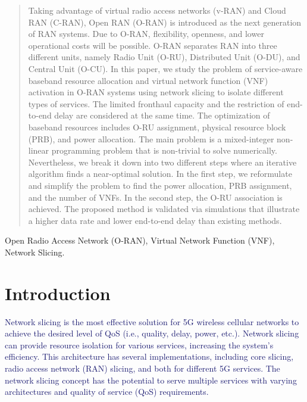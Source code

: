 \documentclass[lettersize,journal]{IEEEtran}
\begin{document}
\begin{abstract}
Taking advantage of virtual radio access networks (v-RAN) and Cloud RAN (C-RAN), Open RAN (O-RAN) is introduced as the next generation of RAN systems. Due to O-RAN, flexibility, openness, and lower operational costs will be possible. O-RAN separates RAN into three different units, namely Radio Unit (O-RU), Distributed Unit (O-DU), and Central Unit (O-CU).
In this paper, we study the problem of service-aware baseband resource allocation and virtual network function (VNF) activation in O-RAN systems using network slicing to isolate different types of services.
The limited fronthaul capacity and the restriction of end-to-end delay are considered at the same time.
The optimization of baseband resources includes O-RU assignment, physical resource block (PRB), and power allocation. The main problem is a mixed-integer non-linear programming problem that is non-trivial to solve numerically.
Nevertheless, we break it down into two different steps where an iterative algorithm finds a near-optimal solution.
In the first step, we reformulate and simplify the problem to find the power allocation, PRB assignment, and the number of VNFs. In the second step, the O-RU association is achieved.
The proposed method is validated via simulations that illustrate a higher data rate and lower end-to-end delay than existing methods.
\end{abstract}
\begin{IEEEkeywords}
Open Radio Access Network (O-RAN), Virtual Network Function (VNF), Network Slicing.
\end{IEEEkeywords}
\section{Introduction}
\textcolor{MidnightBlue}{Network slicing is the most effective solution for 5G wireless cellular networks to achieve the desired level of QoS (i.e., quality, delay, power, etc.). Network slicing can provide resource isolation for various services, increasing the system's efficiency. This architecture has several implementations, including core slicing, radio access network (RAN) slicing, and both for different 5G services. The network slicing concept has the potential to serve multiple services with varying architectures and quality of service (QoS) requirements.}
\end{document}
